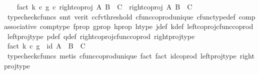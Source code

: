 \begin{isabellebody}
\ \ \isamarkupfalse%
\ fact{}{\isacharcolon}{\kern0pt}\ {\isachardoublequoteopen}{\isacharparenleft}{\kern0pt}k\ {\isasymcirc}\isactrlsub c\ g{\isacharparenright}{\kern0pt}\ {\isasymcirc}\isactrlsub c\ {\isacharparenleft}{\kern0pt}right{\isacharunderscore}{\kern0pt}coproj\ A\ {\isacharparenleft}{\kern0pt}B\ {\isasymCoprod}\ C{\isacharparenright}{\kern0pt}{\isacharparenright}{\kern0pt}\ {\isacharequal}{\kern0pt}\ {\isacharparenleft}{\kern0pt}right{\isacharunderscore}{\kern0pt}coproj\ A\ {\isacharparenleft}{\kern0pt}B\ {\isasymCoprod}\ C{\isacharparenright}{\kern0pt}{\isacharparenright}{\kern0pt}{\isachardoublequoteclose}\isanewline
\ \ \ \ \isamarkupfalse%
\ {\isacharparenleft}{\kern0pt}typecheck{\isacharunderscore}{\kern0pt}cfuncs{\isacharcomma}{\kern0pt}\ smt\ {\isacharparenleft}{\kern0pt}verit{\isacharcomma}{\kern0pt}\ ccfv{\isacharunderscore}{\kern0pt}threshold{\isacharparenright}{\kern0pt}\ cfunc{\isacharunderscore}{\kern0pt}coprod{\isacharunderscore}{\kern0pt}unique\ cfunc{\isacharunderscore}{\kern0pt}type{\isacharunderscore}{\kern0pt}def\ comp{\isacharunderscore}{\kern0pt}associative\ comp{\isacharunderscore}{\kern0pt}type\ f{\isacharunderscore}{\kern0pt}prop\ g{\isacharunderscore}{\kern0pt}prop\ h{\isacharunderscore}{\kern0pt}prop{}\ h{\isacharunderscore}{\kern0pt}type\ j{\isacharunderscore}{\kern0pt}def\ k{\isacharunderscore}{\kern0pt}def\ left{\isacharunderscore}{\kern0pt}coproj{\isacharunderscore}{\kern0pt}cfunc{\isacharunderscore}{\kern0pt}coprod\ left{\isacharunderscore}{\kern0pt}proj{\isacharunderscore}{\kern0pt}type\ p{\isacharunderscore}{\kern0pt}def\ q{\isacharunderscore}{\kern0pt}def\ right{\isacharunderscore}{\kern0pt}coproj{\isacharunderscore}{\kern0pt}cfunc{\isacharunderscore}{\kern0pt}coprod\ right{\isacharunderscore}{\kern0pt}proj{\isacharunderscore}{\kern0pt}type{\isacharparenright}{\kern0pt}\isanewline
\ \ \isamarkupfalse%
\ fact{}{\isacharcolon}{\kern0pt}\ {\isachardoublequoteopen}{\isacharparenleft}{\kern0pt}k\ {\isasymcirc}\isactrlsub c\ g{\isacharparenright}{\kern0pt}\ {\isacharequal}{\kern0pt}\ id{\isacharparenleft}{\kern0pt}\ A\ {\isasymCoprod}\ {\isacharparenleft}{\kern0pt}B\ {\isasymCoprod}\ C{\isacharparenright}{\kern0pt}{\isacharparenright}{\kern0pt}{\isachardoublequoteclose}\isanewline
\ \ \ \ \isamarkupfalse%
\ {\isacharparenleft}{\kern0pt}typecheck{\isacharunderscore}{\kern0pt}cfuncs{\isacharcomma}{\kern0pt}\ metis\ cfunc{\isacharunderscore}{\kern0pt}coprod{\isacharunderscore}{\kern0pt}unique\ fact{}\ fact{}\ id{\isacharunderscore}{\kern0pt}coprod\ left{\isacharunderscore}{\kern0pt}proj{\isacharunderscore}{\kern0pt}type\ right{\isacharunderscore}{\kern0pt}proj{\isacharunderscore}{\kern0pt}type{\isacharparenright}{\kern0pt}\isanewline

\end{isabellebody}
